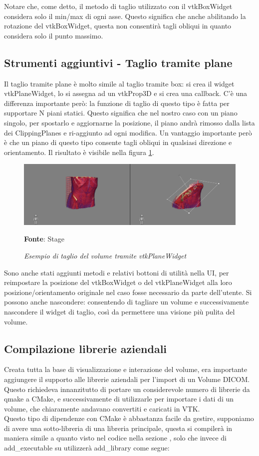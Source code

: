 Notare che, come detto, il metodo di taglio utilizzato con il vtkBoxWidget considera solo il min/max di ogni asse. Questo significa che anche abilitando la rotazione del vtkBoxWidget, questa non consentirà tagli obliqui in quanto considera solo il punto massimo. 

\subsection{Strumenti aggiuntivi - Taglio tramite plane}
Il taglio tramite plane è molto simile al taglio tramite box: si crea il widget vtkPlaneWidget, lo si assegna ad un vtkProp3D e si crea una callback. C'è una differenza importante però: la funzione di taglio di questo tipo è fatta per supportare N piani statici. Questo significa che nel nostro caso con un piano singolo, per spostarlo e aggiornarne la posizione, il piano andrà rimosso dalla lista dei ClippingPlanes e ri-aggiunto ad ogni modifica. Un vantaggio importante però è che un piano di questo tipo consente tagli obliqui in qualsiasi direzione e orientamento. Il risultato è visibile nella figura \ref{fig: Taglio Plane}.

\begin{figure}[h]
    \centering
    \includegraphics[width=1\textwidth]{immagini/svolgimento/planecrop.png}
    \caption{\textit{Esempio di taglio del volume tramite vtkPlaneWidget}}
    \textbf{Fonte}: Stage
    \label{fig: Taglio Plane}
\end{figure}

Sono anche stati aggiunti metodi e relativi bottoni di utilità nella UI, per reimpostare la posizione del vtkBoxWidget o del vtkPlaneWidget alla loro posizione/orientamento originale nel caso fosse necessario da parte dell'utente. Si possono anche nascondere: consentendo di tagliare un volume e successivamente nascondere il widget di taglio, così da permettere una visione più pulita del volume.

\subsection{Compilazione librerie aziendali}
Creata tutta la base di visualizzazione e interazione del volume, era importante aggiungere il supporto alle librerie aziendali per l'import di un Volume DICOM. Questo richiedeva innanzitutto di portare un considerevole numero di librerie da qmake a CMake, e successivamente di utilizzarle per importare i dati di un volume, che chiaramente andavano convertiti e caricati in VTK.
\\
Questo tipo di dipendenze con CMake è abbastanza facile da gestire, supponiamo di avere una sotto-libreria di una libreria principale, questa si compilerà in maniera simile a quanto visto nel codice nella sezione , solo che invece di add\_executable su utilizzerà add\_library come segue:


